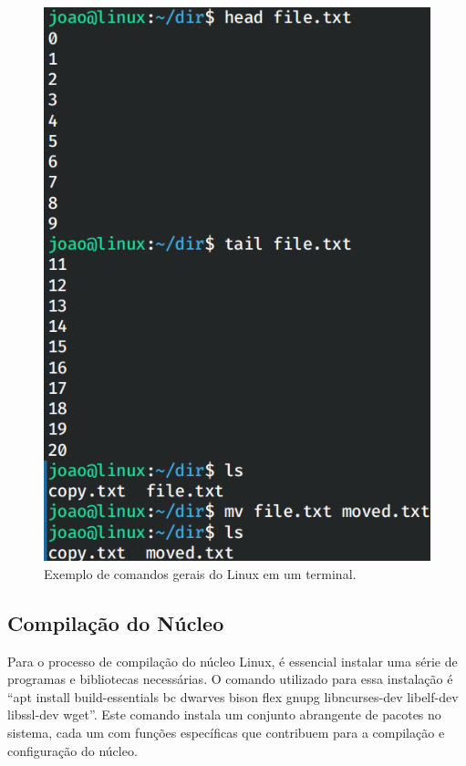 \documentclass[
	12pt,				%
	oneside,   	        %
	a4paper,			%
	english,			%
	french,				%
	spanish,			%
	brazil,				%
	]{pacotes/abntex2}
\begin{document}
\begin{figure}[H]
  \centering
  \includegraphics[scale=0.5]{figuras/commons2.png}
  \caption{Exemplo de comandos gerais do Linux em um terminal.}
  \label{fig:comandos2}
\end{figure}

\subsection{Compilação do Núcleo}
\label{subsec:compilacao}

Para o processo de compilação do núcleo Linux, é essencial instalar uma série de programas e bibliotecas necessárias. O comando utilizado para essa instalação é ``apt install build-essentials bc dwarves bison flex gnupg libncurses-dev libelf-dev libssl-dev wget''. Este comando instala um conjunto abrangente de pacotes no sistema, cada um com funções específicas que contribuem para a compilação e configuração do núcleo.
\end{document}
